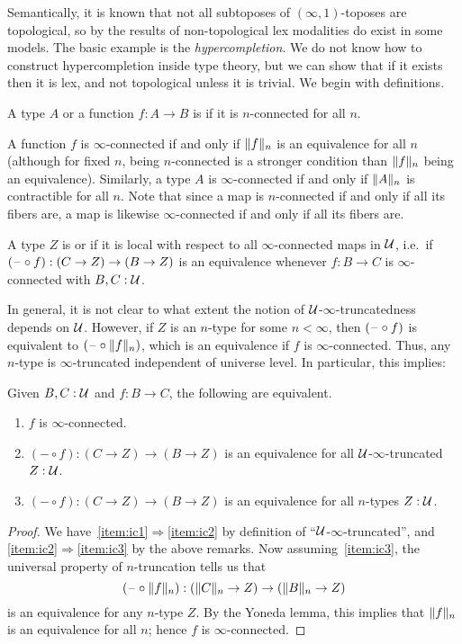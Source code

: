 Semantically, it is known that not all subtoposes of $(\infty,1)$-toposes are topological, so by the results of \cite{RijkeShulmanSpitters} non-topological lex modalities do exist in some models.
The basic example is the \emph{hypercompletion}.
We do not know how to construct hypercompletion inside type theory, but we can show that if it exists then it is lex, and not topological unless it is trivial.
We begin with definitions.

\begin{defn}
  A type $A$ or a function $f:A\to B$ is  if it is $n$-connected for all $n$.
\end{defn}

A function $f$ is $\infty$-connected if and only if $\trunc n f$ is an equivalence for all $n$ (although for fixed $n$, being $n$-connected is a stronger condition than $\trunc n f$ being an equivalence).
Similarly, a type $A$ is $\infty$-connected if and only if $\trunc n A$ is contractible for all $n$.
Note that since a map is $n$-connected if and only if all its fibers are, a map is likewise $\infty$-connected if and only if all its fibers are.

\begin{defn}
  A type $Z$ is  or  if it is local with respect to all $\infty$-connected maps in $\UU$, i.e.\ if $(\blank\circ f):(C\to Z) \to (B\to Z)$ is an equivalence whenever $f:B\to C$ is $\infty$-connected with $B,C:\UU$.
\end{defn}

In general, it is not clear to what extent the notion of $\UU$-$\infty$-truncatedness depends on $\UU$.
However, if $Z$ is an $n$-type for some $n<\infty$, then $(\blank\circ f)$ is equivalent to $(\blank\circ \trunc nf)$, which is an equivalence if $f$ is $\infty$-connected.
Thus, any $n$-type is $\infty$-truncated independent of universe level.
In particular, this implies:

\begin{lem}\label{thm:infconn}
  Given $B,C:\UU$ and $f:B\to C$, the following are equivalent.
  \begin{enumerate}
  \item $f$ is $\infty$-connected.\label{item:ic1}
  \item $(-\circ f):(C\to Z) \to (B\to Z)$ is an equivalence for all $\UU$-$\infty$-truncated $Z:\UU$.\label{item:ic2}
  \item $(-\circ f):(C\to Z) \to (B\to Z)$ is an equivalence for all $n$-types $Z:\UU$.\label{item:ic3}
  \end{enumerate}
\end{lem}
\begin{proof}
  We have~\ref{item:ic1}$\Rightarrow$\ref{item:ic2} by definition of ``$\UU$-$\infty$-truncated'', and \ref{item:ic2}$\Rightarrow$\ref{item:ic3} by the above remarks.
  Now assuming~\ref{item:ic3}, the universal property of $n$-truncation tells us that
  \[ (\blank\circ \trunc nf):(\trunc n C\to Z) \to (\trunc nB\to Z) \]
  is an equivalence for any $n$-type $Z$.
  By the Yoneda lemma, this implies that $\trunc n f$ is an equivalence for all $n$; hence $f$ is $\infty$-connected.
\end{proof}

